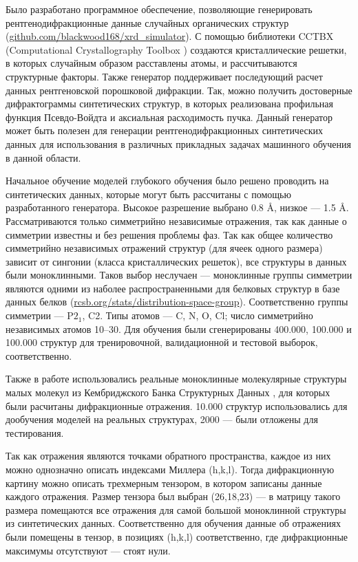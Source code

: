 \documentclass[a4paper,12pt]{article}
\begin{document}
{Было разработано программное обеспечение, позволяющие генерировать рентгенодифракционные данные случайных органических структур (\url{github.com/blackwood168/xrd_simulator}). С помощью библиотеки CCTBX (Computational Crystallography Toolbox \cite{cctbx}) создаются кристаллические решетки, в которых случайным образом расставлены атомы, и рассчитываются структурные факторы. Также генератор поддерживает последующий расчет данных рентгеновской порошковой дифракции. Так, можно получить достоверные дифрактограммы синтетических структур, в которых реализована профильная функция Псевдо-Войдта и аксиальная расходимость пучка. Данный генератор может быть полезен для генерации рентгенодифракционных синтетических данных для использования в различных прикладных задачах машинного обучения в данной области.

Начальное обучение моделей глубокого обучения было решено проводить на синтетических данных, которые могут быть рассчитаны с помощью разработанного генератора. Высокое разрешение выбрано 0.8 Å, низкое --- 1.5 Å. Рассматриваются только симметрийно независимые отражения, так как данные о симметрии известны и без решения проблемы фаз. Так как общее количество симметрийно независимых отражений структур (для ячеек одного размера) зависит от сингонии (класса кристаллических решеток), все структуры в данных были моноклинными. Таков выбор неслучаен --- моноклинные группы симметрии являются одними из наболее распространенными для белковых структур в базе данных белков (\url{rcsb.org/stats/distribution-space-group}). Соответственно группы симметрии --- P$2_1$, C2. Типы атомов --- C, N, O, Cl; число симметрийно независимых атомов 10--30. Для обучения были сгенерированы 400.000, 100.000 и 100.000 структур для тренировочной, валидационной и тестовой выборок, соответственно.

Также в работе использовались реальные моноклинные молекулярные структуры малых молекул из Кембриджского Банка Структурных Данных \cite{csd}, для которых были расчитаны дифракционные отражения. 10.000 структур использовались для дообучения моделей на реальных структурах, 2000 --- были отложены для тестирования.

Так как отражения являются точками обратного пространства, каждое из них можно однозначно описать индексами Миллера (h,k,l). Тогда дифракционную картину можно описать трехмерным тензором, в котором записаны данные каждого отражения. Размер тензора был выбран (26,18,23) --- в матрицу такого размера помещаются все отражения для самой большой моноклинной структуры из синтетических данных. Соответственно для обучения данные об отражениях были помещены в тензор, в позициях (h,k,l) соответственно, где дифракционные максимумы отсутствуют --- стоят нули.

}
\end{document}
